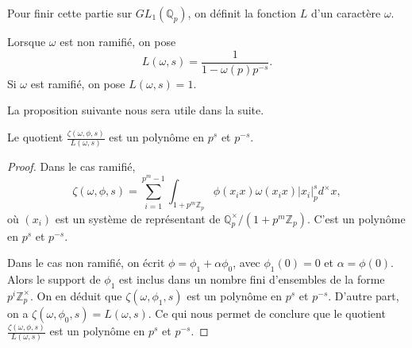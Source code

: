Pour finir cette partie sur $GL_1(\mathbb{Q}_p)$, on définit la fonction $L$ d'un caractère $\omega$.
\begin{definition}
Lorsque $\omega$ est non ramifié, on pose
\begin{equation}
L(\omega,s) = \frac{1}{1-\omega(p)p^{-s}}.
\end{equation}
Si $\omega$ est ramifié, on pose $L(\omega,s)=1$.
\end{definition}

La proposition suivante nous sera utile dans la suite.
\begin{proposition}
Le quotient $\frac{\zeta(\omega, \phi, s)}{L(\omega,s)}$ est un polynôme en $p^s$ et $p^{-s}$.
\end{proposition}

\begin{proof}
Dans le cas ramifié,
\begin{equation}
\zeta(\omega, \phi, s)=\sum_{i=1}^{p^{m}-1} \int_{1+p^{m}\mathbb{Z}_p} \phi(x_ix)\omega(x_ix)|x_i|_p^s d^\times x,
\end{equation}
où $(x_i)$ est un système de représentant de $\mathbb{Q}_p^\times/(1+p^m\mathbb{Z}_p)$. C'est un polynôme en $p^s$ et $p^{-s}$.

Dans le cas non ramifié, on écrit $\phi = \phi_1 + \alpha \phi_0$, avec $\phi_1(0)=0$ et $\alpha = \phi(0)$. Alors le support de $\phi_1$ est inclus dans un nombre fini d'ensembles de la forme $p^i \mathbb{Z}_p^\times$. On en déduit que $\zeta(\omega, \phi_1, s)$ est un polynôme en $p^s$ et $p^{-s}$. D'autre part, on a $\zeta(\omega, \phi_0, s) = L(\omega, s)$. Ce qui nous permet de conclure que le quotient $\frac{\zeta(\omega, \phi, s)}{L(\omega,s)}$ est un polynôme en $p^s$ et $p^{-s}$.
\end{proof}